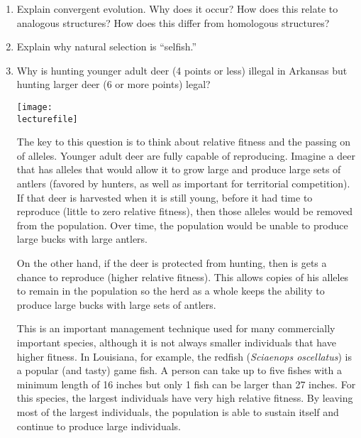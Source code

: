 \documentclass[letterpaper]{tufte-handout}
\newcommand\lecturefile{163_lecture05_fullsize}
\begin{document}
\begin{enumerate}

	\item Explain convergent evolution. Why does it occur? How does this relate to analogous structures? How does this differ from homologous structures?

	\item	Explain why natural selection is ``selfish.''

	\item	Why is hunting younger adult deer (4 points or less) illegal in Arkansas but hunting larger deer (6 or more points) legal?  
	
	\begin{marginfigure}[0.5in]
		\texttt{[image: \\lecturefile]}
	\end{marginfigure}
	
	The key to this question is to think about relative fitness and the passing on of alleles.  Younger adult deer are fully capable of reproducing. Imagine a deer that has alleles that would allow it to grow large and produce large sets of antlers (favored by hunters, as well as important for territorial competition). If that deer is harvested when it is still young, before it had time to reproduce (little to zero relative fitness), then those alleles would be removed from the population. Over time, the population would be unable to produce large bucks with large antlers.	
	
	On the other hand, if the deer is protected from hunting, then is gets a chance to reproduce (higher relative fitness). This allows copies of his alleles to remain in the population so the herd as a whole keeps the ability to produce large bucks with large sets of antlers.
	
	This is an important management technique used for many commercially important species, although it is not always smaller individuals that have higher fitness. In Louisiana, for example, the redfish (\textit{Sciaenops oscellatus}) is a popular (and tasty) game fish. A person can take up to five fishes with a minimum length of 16 inches but only 1 fish can be larger than 27 inches. For this species, the largest individuals have very high relative fitness. By leaving most of the largest individuals, the population is able to sustain itself and continue to produce large individuals.
	


\end{enumerate}
\end{document}

